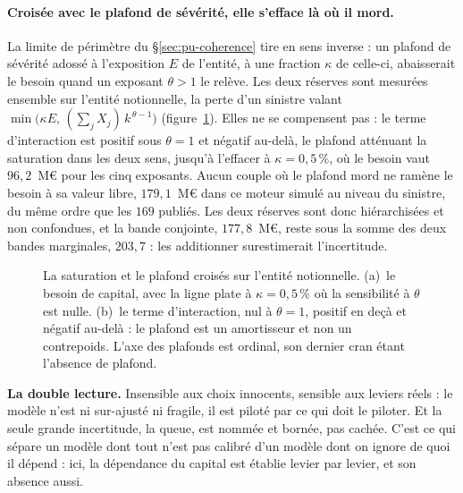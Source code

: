 \paragraph{Croisée avec le plafond de sévérité, elle s'efface là où il mord.} La limite de
périmètre du \S\ref{sec:pu-coherence} tire en sens inverse : un plafond de sévérité adossé à
l'exposition $E$ de l'entité, à une fraction $\kappa$ de celle-ci, abaisserait le besoin quand un
exposant $\theta > 1$ le relève. Les deux réserves sont mesurées ensemble sur l'entité notionnelle,
la perte d'un sinistre valant $\min\bigl(\kappa E,\,(\sum_j X_j)\,k^{\,\theta-1}\bigr)$
(figure~\ref{fig:plafond-saturation-corps}). Elles ne se compensent pas : le terme d'interaction est
positif sous $\theta = 1$ et négatif au-delà, le plafond atténuant la saturation dans les deux sens,
jusqu'à l'effacer à $\kappa = 0{,}5\,\%$, où le besoin vaut $96{,}2$~M\euro{} pour les cinq
exposants. Aucun couple où le plafond mord ne ramène le besoin à sa valeur libre, $179{,}1$~M\euro{}
dans ce moteur simulé au niveau du sinistre, du même ordre que les $169$ publiés. Les deux réserves sont donc hiérarchisées et non confondues, et la bande
conjointe, $177{,}8$~M\euro{}, reste sous la somme des deux bandes marginales, $203{,}7$ : les
additionner surestimerait l'incertitude.

\begin{figure}[H]\centering
{}
\caption{La saturation et le plafond croisés sur l'entité notionnelle. (a)~le besoin de capital,
avec la ligne plate à $\kappa = 0{,}5\,\%$ où la sensibilité à $\theta$ est nulle. (b)~le terme
d'interaction, nul à $\theta = 1$, positif en deçà et négatif au-delà : le plafond est un
amortisseur et non un contrepoids. L'axe des plafonds est ordinal, son dernier cran étant l'absence
de plafond.}
\label{fig:plafond-saturation-corps}
\end{figure}

\vspace{2pt}


\begin{cle}
\textbf{La double lecture.} \og Insensible aux choix innocents, sensible aux leviers réels \fg :
le modèle n'est ni sur-ajusté ni fragile, il est piloté par ce qui doit le piloter.
Et la seule grande incertitude, la queue, est nommée et bornée, pas cachée. C'est ce qui
sépare un modèle dont tout n'est pas calibré d'un modèle dont on ignore de quoi il dépend :
ici, la dépendance du capital est établie levier par levier, et son absence aussi.
\end{cle}


